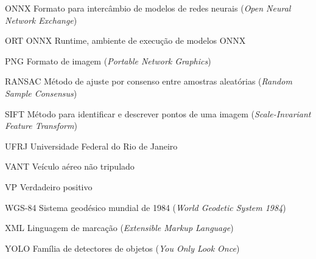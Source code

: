\begin{siglas}
    \item[ONNX]  Formato para intercâmbio de modelos de redes neurais (\textit{Open Neural Network Exchange})
    \item[ORT]   ONNX Runtime, ambiente de execução de modelos ONNX
    \item[PNG] Formato de imagem (\textit{Portable Network Graphics})
    \item[RANSAC] Método de ajuste por consenso entre amostras aleatórias (\textit{Random Sample Consensus})
    \item[SIFT]  Método para identificar e descrever pontos de uma imagem (\textit{Scale-Invariant Feature Transform})
    \item[UFRJ]  Universidade Federal do Rio de Janeiro
    \item[VANT]  Veículo aéreo não tripulado
    \item[VP]    Verdadeiro positivo
    \item[WGS-84] Sistema geodésico mundial de 1984 (\textit{World Geodetic System 1984})
    \item[XML] Linguagem de marcação (\textit{Extensible Markup Language})
    \item[YOLO]  Família de detectores de objetos (\textit{You Only Look Once})
\end{siglas}
